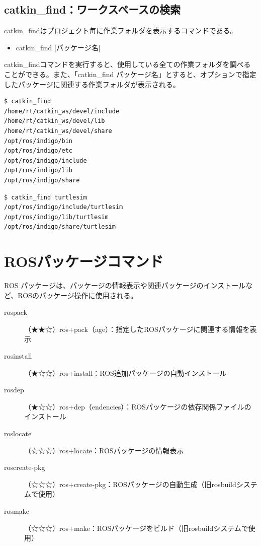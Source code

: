 \subsection{catkin\_find：ワークスペースの検索}

catkin\_findはプロジェクト毎に作業フォルダを表示するコマンドである。

\begin{itemize}
\item  catkin\_find [パッケージ名]
\end{itemize}

catkin\_findコマンドを実行すると、使用している全ての作業フォルダを調べることができる。また、「catkin\_find パッケージ名」とすると、オプションで指定したパッケージに関連する作業フォルダが表示される。

\begin{lstlisting}[language=ROS]
$ catkin_find
/home/rt/catkin_ws/devel/include
/home/rt/catkin_ws/devel/lib
/home/rt/catkin_ws/devel/share
/opt/ros/indigo/bin
/opt/ros/indigo/etc
/opt/ros/indigo/include
/opt/ros/indigo/lib
/opt/ros/indigo/share
\end{lstlisting}

\begin{lstlisting}[language=ROS]
$ catkin_find turtlesim
/opt/ros/indigo/include/turtlesim
/opt/ros/indigo/lib/turtlesim
/opt/ros/indigo/share/turtlesim
\end{lstlisting}

\section{ROSパッケージコマンド}
ROS パッケージは、パッケージの情報表示や関連パッケージのインストールなど、ROSのパッケージ操作に使用される。

\vspace{\baselineskip}
\noindent
\begin{description}
\item[rospack]（★★☆）ros+pack（age）：指定したROSパッケージに関連する情報を表示
\item[rosinstall]（★☆☆）ros+install：ROS追加パッケージの自動インストール
\item[rosdep]（★☆☆）ros+dep（endencies）：ROSパッケージの依存関係ファイルのインストール
\item[roslocate]（☆☆☆）ros+locate：ROSパッケージの情報表示
\item[roscreate-pkg]（☆☆☆）ros+create-pkg：ROSパッケージの自動生成（旧rosbuildシステムで使用）
\item[rosmake]（☆☆☆）ros+make：ROSパッケージをビルド（旧rosbuildシステムで使用）
\end{description}

